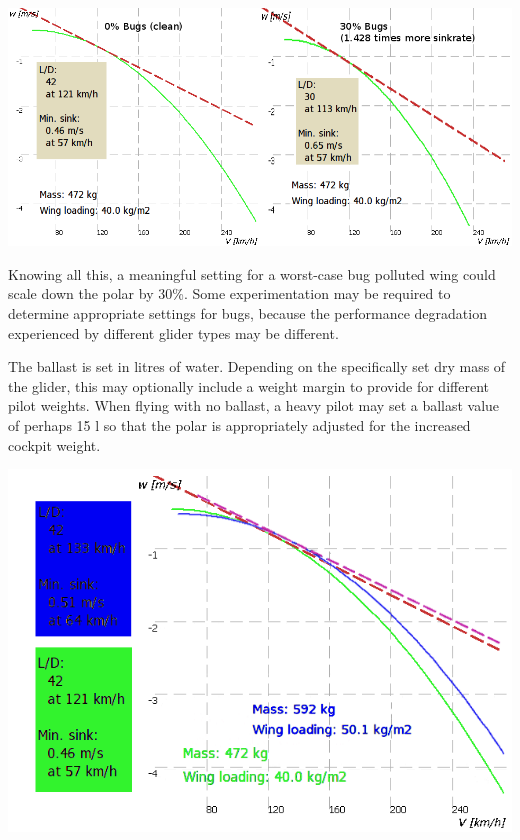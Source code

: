 \begin{center}
\includegraphics[angle=0,width=\linewidth,keepaspectratio='true']{figures/cut-clean-dirty-polar.png}
\end{center}
Knowing all this, a meaningful setting for a worst-case bug polluted wing could
scale down the polar by 30\%. Some experimentation may be required to determine 
appropriate settings for bugs, because the performance degradation experienced 
by different glider types may be different.

The ballast is set in litres of water. 
Depending on the specifically set dry mass of the glider, this may optionally 
include a weight margin to provide for different pilot weights.
  When flying with no ballast, a heavy pilot
may set a ballast value of perhaps 15 l so that the polar is
appropriately adjusted for the increased cockpit weight.

\begin{center}
\includegraphics[angle=0,width=\linewidth,keepaspectratio='true']{figures/overlay-non-balasted-polar.png}
\end{center}


